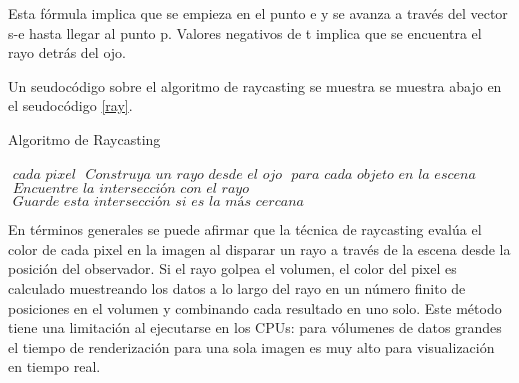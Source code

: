 Esta fórmula implica que se empieza en el punto e y se avanza a través del vector s-e hasta llegar al punto p. Valores negativos de t implica que se encuentra el rayo detrás del ojo.

Un seudocódigo sobre el algoritmo de raycasting se muestra se muestra abajo en el seudocódigo \ref{ray}.

\begin{algorithm}
\caption{Algoritmo de Raycasting}\label{ray}
\begin{algorithmic}[1]
\For $\textit{ cada pixel}$
\State $\textit{ Construya un rayo desde el ojo}$
\For $\textit{ para cada objeto en la escena}$
\State $\textit{ Encuentre la intersección con el rayo}$
\State $\textit{ Guarde esta intersección si es la más cercana}$
\EndFor
\EndFor
\EndProcedure
\end{algorithmic}
\end{algorithm}





En términos generales se puede afirmar que la técnica de raycasting evalúa el color de cada pixel en la imagen al disparar un rayo a través de la escena desde la posición del observador. Si el rayo golpea el volumen, el color del pixel es calculado muestreando los datos a lo largo del rayo en un número finito de posiciones en el volumen  y combinando cada resultado en uno solo. Este método tiene una limitación al ejecutarse en los CPUs: para vólumenes de datos grandes el tiempo de renderización para una sola imagen es muy alto para visualización en tiempo real.


